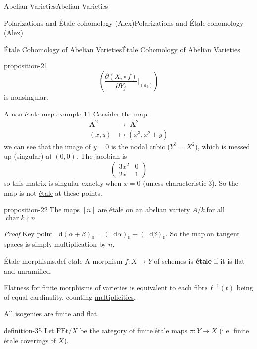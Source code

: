 \documentclass[10pt,]{book}
\makeatletter
\newcommand{\terminology}[1]{\textbf{#1}}
\renewcommand*{\proofname}{Proof}
\renewenvironment{proof}[1][\proofname]{\par
  \pushQED{\qed}%
  \normalfont \topsep6\p@\@plus6\p@\relax
  \trivlist
  \item\relax
    {\itshape
    #1\@addpunct{.}}\hspace\labelsep\ignorespaces
}{%
  \popQED\endtrivlist\@endpefalse
}
\numberwithin{equation}{section}
\newcommand{\diff}{\mathop{}\!\mathrm{d}}
\newcommand{\lb}{[}
\newcommand{\rb}{]}
\DeclareMathOperator{\characteristic}{char}
\DeclareMathOperator{\aff}{\mathbf{A}}
\newcommand{\amp}{&}
\makeatother
\begin{document}
\begin{chapterptx}{Abelian Varieties}{}{Abelian Varieties}{}{}
\begin{sectionptx}{Polarizations and Étale cohomology (Alex)}{}{Polarizations and Étale cohomology (Alex)}{}{}
\begin{subsectionptx}{Étale Cohomology of Abelian Varieties}{}{Étale Cohomology of Abelian Varieties}{}{}
\begin{proposition}{}{}{proposition-21}
\begin{equation*}
\left(\frac{\partial(X_i \circ f)}{\partial Y_j}|_{(a_k)} \right)
\end{equation*}
is nonsingular.%
\end{proposition}
\begin{example}{A non-étale map.}{example-11}%
\hypertarget{p-273}{}%
Consider the map%
\begin{align*}
\aff^2 \amp\to \aff^2\\
(x,y) \amp\mapsto (x^3, x^2 + y)
\end{align*}
we can see that the image of \(y= 0\) is the nodal cubic (\(Y^3 = X^2\)), which is messed up (singular) at \((0,0)\). The jacobian is%
\begin{equation*}
\begin{pmatrix} 3x^2 \amp 0 \\ 2x \amp 1\end{pmatrix}
\end{equation*}
so this matrix is singular exactly when \(x= 0\) (unless characteristic 3). So the map is not \hyperref[def-etale]{étale} at these points.%
\end{example}
\begin{proposition}{}{}{proposition-22}%
\hypertarget{p-274}{}%
The maps \(\lb n\rb\) are \hyperref[def-etale]{étale} on an \hyperref[def-buntes-abvar]{abelian variety} \(A/k\) for all  \(\characteristic{k} \nmid n\)%
\end{proposition}
\begin{proof}\hypertarget{proof-46}{}
\hypertarget{p-275}{}%
Key point \(\diff (\alpha+ \beta)_0 = (\diff \alpha )_0 + (\diff \beta)_0\). So the map on tangent spaces is simply multiplication by \(n\).%
\end{proof}
\begin{definition}{Étale morphisms.}{def-etale}%
\hypertarget{p-276}{}%
A morphism \(f\colon X\to Y\) of schemes is \terminology{étale} if it is flat and unramified.%
\par
\hypertarget{p-277}{}%
Flatness for finite morphisms of varieties is equivalent to each fibre \(f^{-1}(t)\) being of equal cardinality, counting \hyperref[def-riem-order-vanish]{multiplicities}.%
\end{definition}
\hypertarget{p-278}{}%
All \hyperref[def-supersing-isog-isog]{isogenies} are finite and flat.%
\begin{definition}{}{definition-35}%
\hypertarget{p-279}{}%
Let \(\mathrm{FEt}/X\) be the category of finite \hyperref[def-etale]{étale} maps \(\pi\colon Y \to X\) (i.e. finite \hyperref[def-etale]{étale} coverings of \(X\)).%

\end{definition}
\end{subsectionptx}
\end{sectionptx}
\end{chapterptx}
\end{document}
